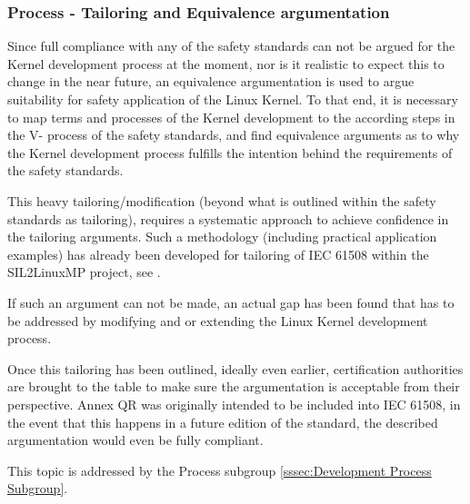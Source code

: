 \documentclass[12pt]{ElisaPaper}
\begin{document}
\subsubsection{Process - Tailoring and Equivalence argumentation}
Since full compliance with any of the safety standards can not be argued for the Kernel development process at the moment, nor is it realistic to expect this to change in the near future, an equivalence argumentation is used to argue suitability for safety application of the Linux Kernel.
To that end, it is necessary to map terms and processes of the Kernel development to the according steps in the V- process of the safety standards, and find equivalence arguments as to why the Kernel development process fulfills the intention behind the requirements of the safety standards.

This heavy tailoring/modification (beyond what is outlined within the safety standards as tailoring), requires a systematic approach to achieve confidence in the tailoring arguments.
Such a methodology (including practical application examples) has already been developed for tailoring of IEC 61508 within the SIL2LinuxMP project, see \cite{AnnexQR}.

If such an argument can not be made, an actual gap has been found that has to be addressed by modifying and or extending the Linux Kernel development process.

Once this tailoring has been outlined, ideally even earlier, certification authorities are brought to the table to make sure the argumentation is acceptable from their perspective.
Annex QR was originally intended to be included into IEC 61508, in the event that this happens in a future edition of the standard, the described argumentation would even be fully compliant.

This topic is addressed by the Process subgroup \ref{sssec:Development Process Subgroup}.
\end{document}
